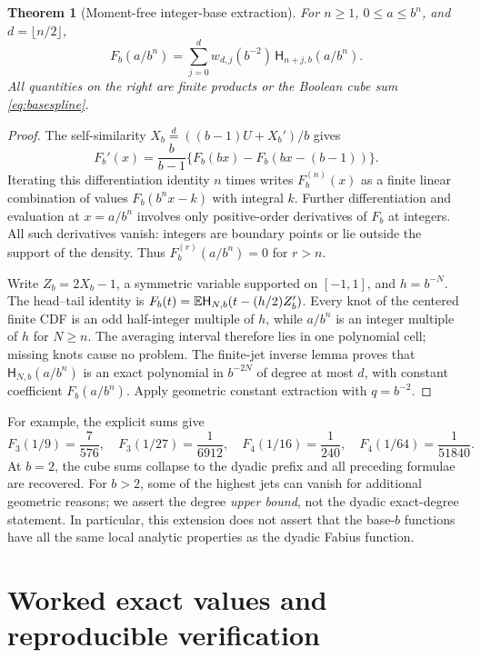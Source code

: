 \documentclass[11pt,oneside]{article}
\newtheorem{theorem}{Theorem}[section]
\theoremstyle{definition}\newtheorem{definition}[theorem]{Definition}
\theoremstyle{remark}\newtheorem{remark}[theorem]{Remark}
\begin{document}
\begin{theorem}[Moment-free integer-base extraction]
\label{thm:basequarter}
For $n\ge1$, $0\le a\le b^n$, and $d=\lfloor n/2\rfloor$,
\begin{equation}
 \boxed{\displaystyle
 F_b(a/b^n)=\sum_{j=0}^{d}w_{d,j}(b^{-2})\,
                       \mathsf H_{n+j,b}(a/b^n).}
 \label{eq:basequarter}
\end{equation}
All quantities on the right are finite products or the Boolean cube sum
\eqref{eq:basespline}.
\end{theorem}
\begin{proof}
The self-similarity
$X_b\overset d=((b-1)U+X_b')/b$ gives
\begin{equation}
 F_b'(x)=\frac b{b-1}\{F_b(bx)-F_b(bx-(b-1))\}.
 \label{eq:basediff}
\end{equation}
Iterating this differentiation identity $n$ times writes $F_b^{(n)}(x)$
as a finite linear combination of values $F_b(b^nx-k)$ with integral $k$.
Further differentiation and evaluation at $x=a/b^n$ involves only
positive-order derivatives of $F_b$ at integers. All such derivatives
vanish: integers are boundary points or lie outside the support of the
density. Thus $F_b^{(r)}(a/b^n)=0$ for $r>n$.

Write $Z_b=2X_b-1$, a symmetric variable supported on $[-1,1]$, and
$h=b^{-N}$. The head--tail identity is
$F_b(t)=\mathbb E\mathsf H_{N,b}(t-(h/2)Z_b')$.
Every knot of the centered finite CDF is an odd half-integer multiple of
$h$, while $a/b^n$ is an integer multiple of $h$ for $N\ge n$.
The averaging interval therefore lies in one polynomial cell; missing
knots cause no problem. The finite-jet inverse lemma proves that
$\mathsf H_{N,b}(a/b^n)$ is an exact polynomial in $b^{-2N}$ of degree
at most $d$, with constant coefficient $F_b(a/b^n)$. Apply geometric
constant extraction with $q=b^{-2}$.
\end{proof}

For example, the explicit sums give
\[
 F_3(1/9)=\frac7{576},\quad F_3(1/27)=\frac1{6912},\quad
 F_4(1/16)=\frac1{240},\quad F_4(1/64)=\frac1{51840}.
\]
At $b=2$, the cube sums collapse to the dyadic prefix and all preceding
formulae are recovered. For $b>2$, some of the highest jets can vanish
for additional geometric reasons; we assert the degree \emph{upper bound},
not the dyadic exact-degree statement. In particular, this extension does
not assert that the base-$b$ functions have all the same local analytic
properties as the dyadic Fabius function.

\section{Worked exact values and reproducible verification}
\label{sec:tests}
\end{document}
